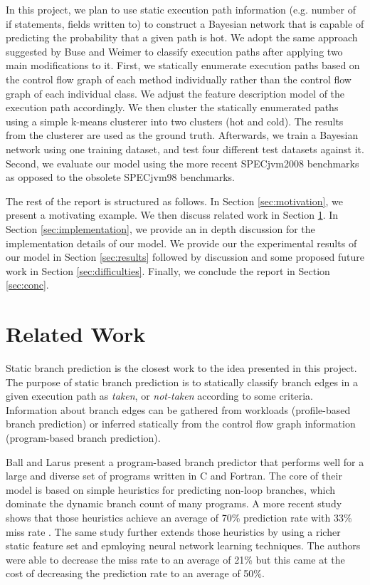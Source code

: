 \documentclass[10pt,twocolumn,letterpaper]{article}
\begin{document}
In this project, we plan to use static execution path information (e.g. number of if statements, fields written to) to construct a Bayesian network that is
capable of predicting the probability that a given path is hot. We adopt the same approach suggested by Buse and Weimer \cite{buse2009road} to classify
execution paths after applying two main modifications to it. First, we statically enumerate execution paths based on the control flow graph of each method
individually rather than the control flow graph of each individual class. We adjust the feature description model of the execution path accordingly. We then
cluster the statically enumerated paths using a simple k-means clusterer into two clusters (hot and cold). The results from the clusterer are used as the ground
truth. Afterwards, we train a Bayesian network using one training dataset, and test four different test datasets against it. Second, we evaluate our model using
the more recent SPECjvm2008 \cite{specjvm2008} benchmarks as opposed to the obsolete SPECjvm98 \cite{specjvm98} benchmarks.

The rest of the report is structured as follows. In Section \ref{sec:motivation}, we present a motivating example. We then discuss related work in Section
\ref{sec:bg}. In Section \ref{sec:implementation}, we provide an in depth discussion for the implementation details of our model. We provide our the
experimental results of our model in Section \ref{sec:results} followed by discussion and some proposed future work in Section \ref{sec:difficulties}.
Finally, we conclude the report in Section \ref{sec:conc}.

\section{Related Work}
\label{sec:bg}
Static branch prediction is the closest work to the idea presented in this project. The purpose of static branch prediction is to statically classify branch
edges in a given execution path as \textit{taken}, or \textit{not-taken} according to some criteria. Information about branch edges can be gathered from
workloads (profile-based branch prediction) or inferred statically from the control flow graph information (program-based branch prediction).

Ball and Larus \cite{ball1993branch} present a program-based branch predictor that performs well for a large and diverse set of programs written in C and
Fortran. The core of their model is based on simple heuristics for predicting non-loop branches, which dominate the dynamic branch count of many programs.
A more recent study shows that those heuristics achieve an average of 70\% prediction rate with 33\% miss rate \cite{calder1997evidence}. The same study
further extends those heuristics by using a richer static feature set and epmloying neural network learning techniques. The authors were able to decrease
the miss rate to an average of 21\% but this came at the cost of decreasing the prediction rate to an average of 50\%.
\end{document}
